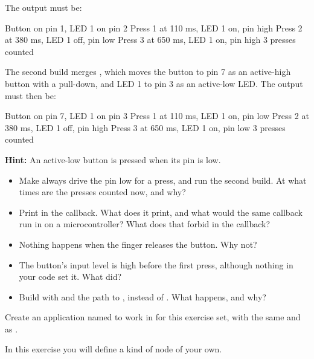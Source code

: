 The output must be:

\begin{console}
Button on pin 1, LED 1 on pin 2
Press 1 at 110 ms, LED 1 on, pin high
Press 2 at 380 ms, LED 1 off, pin low
Press 3 at 650 ms, LED 1 on, pin high
3 presses counted
\end{console}

\noindent The second build merges , which
moves the button to pin 7 as an active-high button with a pull-down, and LED 1 to pin 3 as an
active-low LED. The output must then be:

\begin{console}
Button on pin 7, LED 1 on pin 3
Press 1 at 110 ms, LED 1 on, pin low
Press 2 at 380 ms, LED 1 off, pin high
Press 3 at 650 ms, LED 1 on, pin low
3 presses counted
\end{console}

\noindent \textbf{Hint:} An active-low button is pressed when its pin is low.

\begin{itemize}
  \item Make  always drive the pin low for a press, and run the second build. At what times
    are the presses counted now, and why?
  \item Print  in the callback. What does it print, and what would the same callback run
    in on a microcontroller? What does that forbid in the callback?
  \item Nothing happens when the finger releases the button. Why not?
  \item The button’s input level is high before the first press, although nothing in your code set it. What
    did?
  \item Build with  and the path to , instead of
    . What happens, and why?
\end{itemize}

\label{c2:set:3}
Create an application named  to work in for this exercise set, with the same
 and  as .

\label{c2:ex:3.1}
In this exercise you will define a kind of node of your own.

